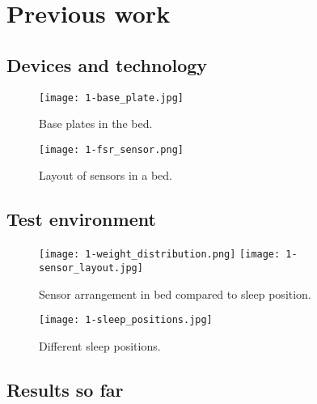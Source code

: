 \chapter{Previous work}

\section{Devices and technology}

\begin{figure}[h]
  \begin{center}
    \texttt{[image: 1-base\_plate.jpg]}
  \end{center}
  \caption{Base plates in the bed.}
  \label{fig:base-plate}
\end{figure}

\begin{figure}[h]
  \begin{center}
    \texttt{[image: 1-fsr\_sensor.png]}
  \end{center}
  \caption{Layout of sensors in a bed.}
  \label{fig:fsr-sensor}
\end{figure}


\section{Test environment}

\begin{figure}[h]
  \begin{center}
    \texttt{[image: 1-weight\_distribution.png]}
    \texttt{[image: 1-sensor\_layout.jpg]}
  \end{center}
  \caption{Sensor arrangement in bed compared to sleep position.}
  \label{fig:sensor-layout}
\end{figure}

\begin{figure}[h]
  \begin{center}
    \texttt{[image: 1-sleep\_positions.jpg]}
  \end{center}
  \caption{Different sleep positions.}
  \label{fig:sleep_positions}
\end{figure}


\section{Results so far}



